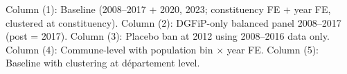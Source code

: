 \begin{table}[htbp]
   \par \raggedright 
   Column (1): Baseline (2008--2017 + 2020, 2023; constituency FE + year FE, clustered at constituency). Column (2): DGFiP-only balanced panel 2008--2017 (post = 2017). Column (3): Placebo ban at 2012 using 2008--2016 data only. Column (4): Commune-level with population bin $\times$ year FE. Column (5): Baseline with clustering at d\'epartement level.
\end{table}


